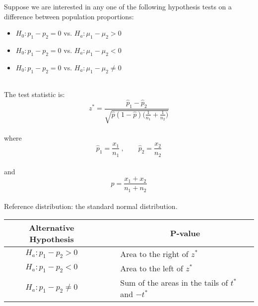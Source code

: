 \begin{hyp}
Suppose we are interested in any one of the following hypothesis tests
on a difference between population proportions:\\

\begin{itemize}
\item	$H_{0} : p_{1} - p_{2}  = 0$  vs. $H_{a}  : \mu_{1} - \mu_{2}  > 0$
\item	$H_{0} : p_{1} - p_{2}  = 0$  vs. $H_{a}  : \mu_{1} - \mu_{2}  < 0$
\item	$H_{0} : p_{1} - p_{2}  = 0$  vs. $H_{a}  : \mu_{1} - \mu_{2}  \neq 0$
\end{itemize}

\hfill\\
The test statistic is:
\begin{equation}
z^{*}	= \displaystyle\frac{ \hat{p}_{1} - \hat{p}_{2}  }{ \sqrt{ \hat{p}( 1 - \hat{p} ) \bigg( \frac{1}{n_{1}} + \frac{1}{n_{2}} \bigg)  }  }
\end{equation}
\hfill\\
where
\begin{equation}
\hat{p}_{1} = \frac{ x_{1} }{ n_{1} }~,   \quad\quad		\hat{p}_{2} = \frac{ x_{2} }{ n_{2} }
\end{equation}
\hfill\\
and
\begin{equation}
\hat{p} = \frac{ x_{1} + x_{2} }{ n_{1} + n_{2} }
\end{equation}
\hfill\\
Reference distribution: the standard normal distribution.\\

\begin{center}
\begin{tabular}{ccl}
Alternative Hypothesis	&	~\quad~	&	\multicolumn{1}{c}{P-value}	\\
\hline
$H_{a}  : p_{1} - p_{2}  >  0$		&	&	Area to the right of $z^{*}$	\\
$H_{a}  : p_{1} - p_{2}  <  0$		&	&	Area to the left of $z^{*}$	\\
$H_{a}  : p_{1} - p_{2}  \neq  0$	&	&	Sum of the areas in the tails of $t^{*}$ and $-t^{*}$
\end{tabular}
\end{center}

\end{hyp}


